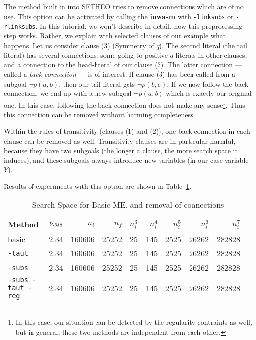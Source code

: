 The method built in into SETHEO tries to remove connections which
are of no use. This option can be activated by calling the {\bf inwasm}
with {\tt -linksubs} or {\tt -rlinksubs}.
In this tutorial, wo won't describe in detail, how this preprocessing
step works. Rather, we explain with selected clauses of our example
what happens.
Let us consider clause (3) (Symmetry of $q$). The second literal
(the tail literal) has several connections: some going to positive
$q$ literals in other clauses, and a connection to the head-literal
of our clause (3). The latter connection --- called a {\em back-connection\/} ---
is of interest. If clause (3) has been called from a subgoal
$\neg p(a,b)$, then our tail literal gets $\neg p(b,a)$. If we now follow
the back-connection, we end up with a new subgoal $\neg p(a,b)$ which
is exactly our original one. In this case, following the back-connection
does not make any sense\footnote{
	In this case, our situation can be detected by the
	regularity-contraints as well, but in general, these
	two methods are independent from each other.
	}.
Thus this connection can be removed without
harming completeness.

Within the rules of transitivity (clauses (1) and (2)), one
back-connection in each clause can be removed as well. 
Transitivity clauses are in particular harmful, because they have two
subgoals (the longer a clause, the more search space it induces), and
these subgoals always introduce new variables (in our case variable $Y$).

Results of experiments with this option are shown in
Table~\ref{tab:tut2:results.linksubs}.

\begin{table}[htb]
\begin{center}
\begin{tabular}{|l|r|r||r|r||r|r|r|r|r|}
\hline
Method & $t_{\SAM}$ & $n_i$ & $n_f$ & 
	$n_i^3$ & $n_i^4$ & $n_i^5$ & $n_i^6$ & $n_i^7$ \\
\hline\hline
basic & 2.34 & 160606 & 25252 &
	25 & 145 & 2525 & 26262 & 282828 \\
\hline
{\tt -taut} & 2.34 & 160606 & 25252 &
	25 & 145 & 2525 & 26262 & 282828 \\
\hline
{\tt -subs} & 2.34 & 160606 & 25252 &
	25 & 145 & 2525 & 26262 & 282828 \\
\hline
{\tt -subs -taut -reg} & 2.34 & 160606 & 25252 &
	25 & 145 & 2525 & 26262 & 282828 \\
\hline\hline
\end{tabular}
\end{center}
\caption{Search Space for Basic ME, and removal of connections}
\label{tab:tut2:results.linksubs}
\end{table}


